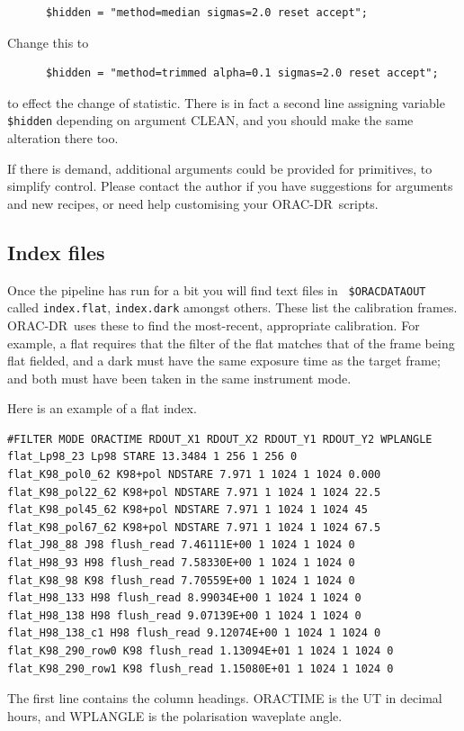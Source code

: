 \documentclass[twoside,11pt]{article}
\newcommand{\xlabel}[1]{}
\renewcommand{\_}{\texttt{\symbol{95}}}
\newcommand{\ORACDR}{{\footnotesize ORAC-DR}}
\begin{document}
\begin{verbatim}
      $hidden = "method=median sigmas=2.0 reset accept"; 
\end{verbatim}
Change this to

\begin{verbatim}
      $hidden = "method=trimmed alpha=0.1 sigmas=2.0 reset accept"; 
\end{verbatim}
to effect the change of statistic.  There is in fact a second line
assigning variable {\tt \$hidden} depending on argument CLEAN, and you
should make the same alteration there too.

If there is demand, additional arguments could be provided for
primitives, to simplify control.  Please contact the author if you
have suggestions for arguments and new recipes, or need help
customising your \ORACDR\ scripts.

\subsection{\xlabel{index_files}Index files\label{index_files}}

Once the pipeline has run for a bit you will find text files in {\tt
\$ORAC\_DATA\_OUT} called {\tt index.flat}, {\tt index.dark} amongst
others.  These list the calibration frames.  \ORACDR\ uses these to
find the most-recent, appropriate calibration.  For example, a flat
requires that the filter of the flat matches that of the frame being
flat fielded, and a dark must have the same exposure time as the
target frame; and both must have been taken in the same instrument
mode.

Here is an example of a flat index.

\begin{verbatim}
#FILTER MODE ORACTIME RDOUT_X1 RDOUT_X2 RDOUT_Y1 RDOUT_Y2 WPLANGLE
flat_Lp98_23 Lp98 STARE 13.3484 1 256 1 256 0
flat_K98_pol0_62 K98+pol NDSTARE 7.971 1 1024 1 1024 0.000
flat_K98_pol22_62 K98+pol NDSTARE 7.971 1 1024 1 1024 22.5
flat_K98_pol45_62 K98+pol NDSTARE 7.971 1 1024 1 1024 45
flat_K98_pol67_62 K98+pol NDSTARE 7.971 1 1024 1 1024 67.5
flat_J98_88 J98 flush_read 7.46111E+00 1 1024 1 1024 0
flat_H98_93 H98 flush_read 7.58330E+00 1 1024 1 1024 0
flat_K98_98 K98 flush_read 7.70559E+00 1 1024 1 1024 0
flat_H98_133 H98 flush_read 8.99034E+00 1 1024 1 1024 0
flat_H98_138 H98 flush_read 9.07139E+00 1 1024 1 1024 0
flat_H98_138_c1 H98 flush_read 9.12074E+00 1 1024 1 1024 0
flat_K98_290_row0 K98 flush_read 1.13094E+01 1 1024 1 1024 0
flat_K98_290_row1 K98 flush_read 1.15080E+01 1 1024 1 1024 0
\end{verbatim}
The first line contains the column headings.  ORACTIME is the UT in
decimal hours, and WPLANGLE is the polarisation waveplate angle.
\end{document}

